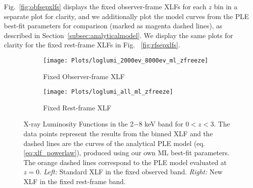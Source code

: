 \documentclass[fleqn,usenatbib]{mnras}
\begin{document}
Fig.~\ref{fig:obfsepxlfs} displays the fixed observer-frame XLFs for each $z$ bin in a separate plot for clarity, and we additionally plot the model curves from the \cite{ebrero2009xmm} PLE best-fit parameters for comparison (marked as magenta dashed lines), as described in Section~\ref{subsec:analyticalmodel}.
We display the same plots for clarity for the fixed rest-frame XLFs in Fig.~ \ref{fig:rfsepxlfs}.
    
    
    \begin{figure*}
    \centering
    	\begin{subfigure}{0.5\textwidth}
    		\centering
      		\texttt{[image: Plots/loglumi\_2000ev\_8000ev\_ml\_zfreeze]}
      		\label{fig:loglumi_2000ev_8000ev}
      		\caption{Fixed Observer-frame XLF}
    	\end{subfigure}%
    	\begin{subfigure}{0.5\textwidth}
    		\centering
      		\texttt{[image: Plots/loglumi\_all\_ml\_zfreeze]}
      		\label{fig:loglumi_all}
      		\caption{Fixed Rest-frame XLF}
    	\end{subfigure}%
    \caption{X-ray Luminosity Functions in the 2$-$8 keV band for $0 < z < 3$. The data points represent the results from the binned XLF and the dashed lines are the curves of the analytical PLE model (eq. \ref{eq:xlf_powerlaw}), produced using our own ML best-fit parameters. The orange dashed lines correspond to the PLE model evaluated at $z=0$. \textit{Left:} Standard XLF in the fixed observed band. \textit{Right:} New XLF in the fixed rest-frame band.}
    \label{fig:xlfplots}
    \end{figure*}
\end{document}
